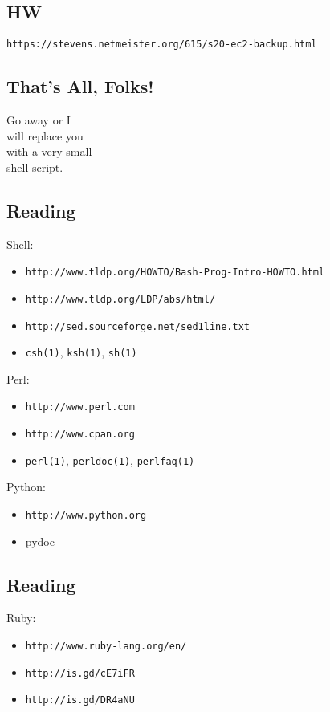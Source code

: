 \documentclass[xga]{xdvislides}
\begin{document}
\subsection{HW}
\vspace{.5in}
\begin{center}
\begin{verbatim}
https://stevens.netmeister.org/615/s20-ec2-backup.html
\end{verbatim}
\end{center}

\subsection{That's All, Folks!}
\vspace*{\fill}
\Huge
\begin{center}
Go away or I \\
will replace you \\
with a very small \\
shell script.
\end{center}
\Normalsize
\vspace*{\fill}


\subsection{Reading}
Shell:
\begin{itemize}
	\item \verb+http://www.tldp.org/HOWTO/Bash-Prog-Intro-HOWTO.html+
	\item \verb+http://www.tldp.org/LDP/abs/html/+
	\item \verb+http://sed.sourceforge.net/sed1line.txt+
	\item \verb+csh(1)+, \verb+ksh(1)+, \verb+sh(1)+
\end{itemize}
Perl:
\begin{itemize}
	\item \verb+http://www.perl.com+
	\item \verb+http://www.cpan.org+
	\item \verb+perl(1)+, \verb+perldoc(1)+,
	\verb+perlfaq(1)+
\end{itemize}
Python:
\begin{itemize}
	\item \verb+http://www.python.org+
	\item pydoc
\end{itemize}

\subsection{Reading}
Ruby:
\begin{itemize}
	\item \verb+http://www.ruby-lang.org/en/+
	\item \verb+http://is.gd/cE7iFR+
	\item \verb+http://is.gd/DR4aNU+
\end{itemize}
\end{document}
